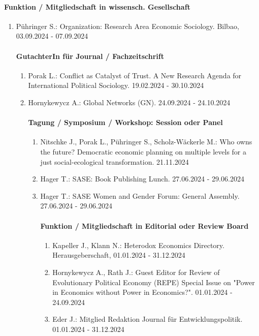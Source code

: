 \begin{enumerate}[leftmargin=*, labelsep=0.5cm]
\begin{enumerate}[leftmargin=*, labelsep=0.5cm]
\begin{enumerate}[leftmargin=*, labelsep=0.5cm]
\begin{enumerate}[leftmargin=*, labelsep=0.5cm]
\paragraph{Funktion / Mitgliedschaft in wissensch. Gesellschaft} 
\begin{enumerate}[leftmargin=*, labelsep=0.5cm] 
 	 \item Pühringer S.: Organization: Research Area Economic Sociology. Bilbao, 03.09.2024 - 07.09.2024 
\paragraph{GutachterIn für Journal / Fachzeitschrift} 
\begin{enumerate}[leftmargin=*, labelsep=0.5cm] 
 	 \item Porak L.: Conflict as Catalyst of Trust. A New Research Agenda for International Political Sociology. 19.02.2024 - 30.10.2024 
	 \item Hornykewycz A.: Global Networks (GN). 24.09.2024 - 24.10.2024 
\paragraph{Tagung / Symposium / Workshop: Session oder Panel} 
\begin{enumerate}[leftmargin=*, labelsep=0.5cm] 
 	 \item Nitschke J., Porak L., Pühringer S., Scholz-Wäckerle M.: Who owns the future? Democratic economic planning on multiple levels for a just social-ecological transformation. 21.11.2024 
	 \item Hager T.: SASE: Book Publishing Lunch. 27.06.2024 - 29.06.2024 
	 \item Hager T.: SASE Women and Gender Forum: General Assembly. 27.06.2024 - 29.06.2024 
\paragraph{Funktion / Mitgliedschaft in Editorial oder Review Board} 
\begin{enumerate}[leftmargin=*, labelsep=0.5cm] 
 	 \item Kapeller J., Klann N.: Heterodox Economics Directory. Herausgeberschaft, 01.01.2024 - 31.12.2024 
	 \item Hornykewycz A., Rath J.: Guest Editor for Review of Evolutionary Political Economy (REPE) Special Issue on "Power in Economics without Power in Economics?". 01.01.2024 - 24.09.2024 
	 \item Eder J.: Mitglied Redaktion Journal für Entwicklungspolitik. 01.01.2024 - 31.12.2024 

\end{enumerate}
\end{enumerate}
\end{enumerate}
\end{enumerate}
\end{enumerate}
\end{enumerate}
\end{enumerate}
\end{enumerate}
